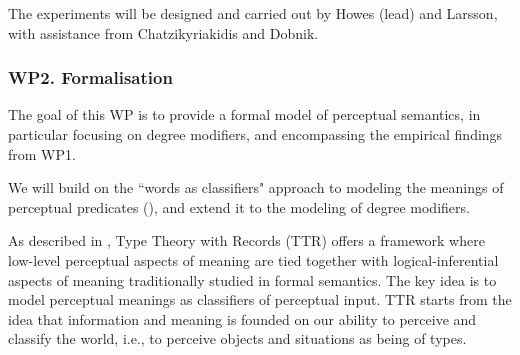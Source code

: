 \documentclass[11pt,a4paper]{article}
\newcommand{\people}[1]{}
\begin{document}


The experiments will be designed and carried out by Howes (lead) and Larsson, with assistance from Chatzikyriakidis and Dobnik.





\subsubsection*{WP2. Formalisation}
\people{rasmus, staffan, robin, stergios, jean-philippe?}

The goal of this WP is to provide a formal model of perceptual semantics, in particular focusing on degree modifiers, and encompassing the empirical findings from WP1. 


We will build on the ``words as classifiers" approach to modeling the meanings of perceptual predicates
(), and extend it to the modeling of degree modifiers.

As described in \cite{Larsson2015formal}, Type Theory with Records (TTR) offers a framework where low-level perceptual aspects of meaning are tied together with  logical-inferential aspects of meaning traditionally studied in  formal semantics. The key idea is to model perceptual meanings as classifiers of perceptual input. TTR starts from the idea that information and meaning is founded on our ability to perceive and classify the world, i.e., to perceive objects and situations as being of types. 
\end{document}
